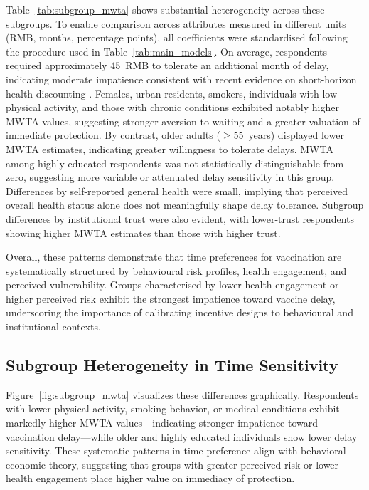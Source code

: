 \documentclass[12pt]{article}
\begin{document}
Table~\ref{tab:subgroup_mwta} shows substantial heterogeneity across these subgroups. To enable comparison across 
attributes measured in different units (RMB, months, percentage points), all coefficients were 
standardised following the procedure used in Table~\ref{tab:main_models}. On average, respondents required 
approximately 45~RMB to tolerate an additional month of delay, indicating moderate impatience 
consistent with recent evidence on short-horizon health discounting 
\citep{lin2024incentives,guillon2024impatience}. Females, urban residents, smokers, individuals 
with low physical activity, and those with chronic conditions exhibited notably higher MWTA 
values, suggesting stronger aversion to waiting and a greater valuation of immediate protection. 
By contrast, older adults ($\geq$55~years) displayed lower MWTA estimates, indicating greater 
willingness to tolerate delays. MWTA among highly educated respondents was not statistically 
distinguishable from zero, suggesting more variable or attenuated delay sensitivity in this 
group. Differences by self-reported general health were small, implying that perceived overall 
health status alone does not meaningfully shape delay tolerance. Subgroup differences by 
institutional trust were also evident, with lower-trust respondents showing higher MWTA 
estimates than those with higher trust.

Overall, these patterns demonstrate that time preferences for vaccination are systematically 
structured by behavioural risk profiles, health engagement, and perceived vulnerability. Groups 
characterised by lower health engagement or higher perceived risk exhibit the strongest 
impatience toward vaccine delay, underscoring the importance of calibrating incentive designs 
to behavioural and institutional contexts.

\clearpage

\clearpage

\subsection{Subgroup Heterogeneity in Time Sensitivity}


Figure~\ref{fig:subgroup_mwta} visualizes these differences graphically.
Respondents with lower physical activity, smoking behavior, or medical conditions exhibit markedly higher MWTA values—indicating stronger impatience toward vaccination delay—while older and highly educated individuals show lower delay sensitivity.
These systematic patterns in time preference align with behavioral-economic theory, suggesting that groups with greater perceived risk or lower health engagement place higher value on immediacy of protection.
\end{document}
